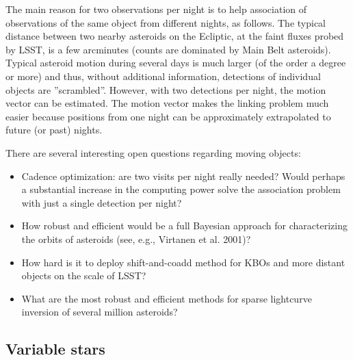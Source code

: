 \documentclass{iau}
\begin{document}
The main reason for two observations per night is to help association of observations of the same object from 
different nights, as follows. The typical distance between two nearby asteroids on the Ecliptic, at the faint fluxes 
probed by LSST, is a few arcminutes (counts are dominated by Main Belt asteroids). Typical asteroid motion during 
several days is much larger (of the order a degree or more) and thus, without additional information, detections of individual 
objects are ''scrambled''. However, with two detections per night, the motion vector can be estimated. The motion 
vector makes the linking problem much easier because positions from one night can be approximately extrapolated 
to future (or past) nights.

There are several interesting open questions regarding moving objects: 
\begin{itemize}
\item Cadence optimization: are two visits per night really needed?
  Would perhaps a substantial increase in the computing power solve
  the association problem with just a single detection per night?
\item How robust and efficient would be a full Bayesian approach for
  characterizing the orbits of asteroids (see, e.g., Virtanen et al. 2001)? 
\item How hard is it to deploy shift-and-coadd method for KBOs and
  more distant objects on the scale of LSST?
\item What are the most robust and efficient methods for sparse lightcurve inversion of several million asteroids? 
\end{itemize}


\subsection{Variable stars}
\end{document}

